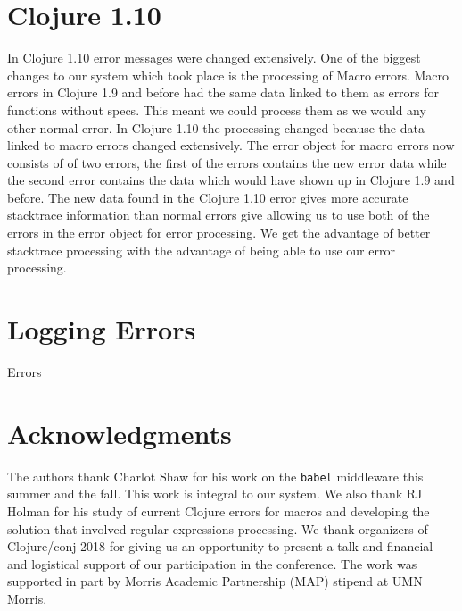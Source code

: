 \documentclass[12pt]{article}
\begin{document}
\section{Clojure 1.10}
In Clojure 1.10 error messages were changed extensively. 
One of the biggest changes to our system which took place is the processing of Macro errors. 
Macro errors in Clojure 1.9 and before had the same data linked to them as errors for functions without specs. 
This meant we could process them as we would any other normal error. 
In Clojure 1.10 the processing changed because the data linked to macro errors changed extensively. 
The error object for macro errors now consists of of two errors, the first of the errors contains the new error data while the second error contains the data which would have shown up in Clojure 1.9 and before. 
The new data found in the Clojure 1.10 error gives more accurate stacktrace information than normal errors give allowing us to use both of the errors in the error object for error processing. 
We get the advantage of better stacktrace processing with the advantage of being able to use our error processing.


\section{Logging Errors}
Errors

\section{Acknowledgments}
The authors thank Charlot Shaw for his work on the {\tt babel} middleware this summer and the fall. 
This work is integral to our system. We also thank RJ Holman for his study of current Clojure errors
for macros and developing the solution that involved regular expressions processing. 
We thank organizers of Clojure/conj 2018 for giving us an opportunity to present a talk 
and financial and logistical support of our participation in the conference. 
The work was supported in part by Morris Academic Partnership (MAP) stipend at UMN Morris.



\end{document}
